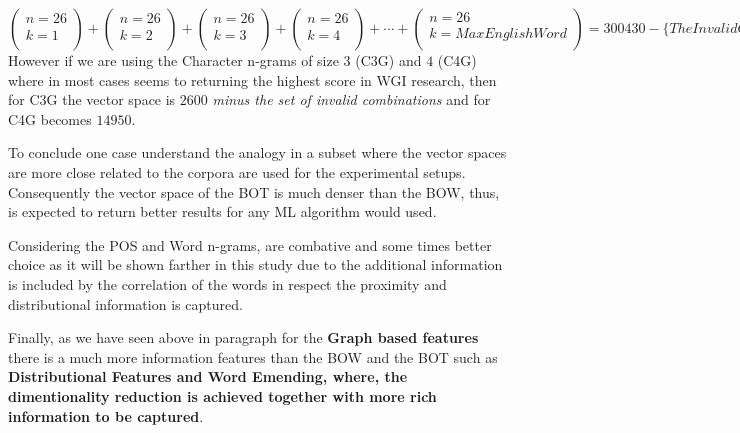 \begin{equation}\label{chap:relevant_work:eq:en_vocab_size_calc}
	 \left(
    	\begin{array}{c}
        	n = 26\\
            k = 1\\
         \end{array}
	\right)
    +
    \left(
    	\begin{array}{c}
        	n = 26\\
            k = 2\\
         \end{array}
	\right) 
      +
    \left(
    	\begin{array}{c}
        	n = 26\\
            k = 3\\
         \end{array}
	\right) 
      +
    \left(
    	\begin{array}{c}
        	n = 26\\
            k = 4\\
         \end{array}
	\right) 
    +
     \cdots 
    +
   \left(
    	\begin{array}{c}
        	n = 26\\
            k = Max English Word\\
         \end{array}
	\right) 
    = 300430 - \{The Invalid Combinations\} =  171,476
\end{equation}
However if we are using the Character n-grams of size $3$ (C3G) and $4$ (C4G) where in most cases seems to returning the highest score in WGI research, then for C3G the vector space is $2600$ \textit{minus the set of invalid combinations} and for C4G becomes $14950$. 

To conclude one case understand the analogy in a subset where the vector spaces are more close related to the corpora are used for the experimental setups. Consequently the vector space of the BOT is much denser than the BOW, thus, is expected to return better results for any ML algorithm would used.

Considering the POS and Word n-grams, are combative and some times better choice as it will be shown farther in this study due to the additional information is included by the correlation of the words in respect the proximity and distributional information is captured.

Finally, as we have seen above in paragraph for the \textbf{Graph based features} there is a much more information features than the BOW and the BOT such as  \textbf{Distributional Features and Word Emending, where, the dimentionality reduction is achieved together with more rich information to be captured}. 

